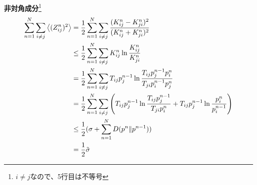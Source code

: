\documentclass[a4paper,11pt]{jsarticle}
\numberwithin{equation}{section}
\begin{document}
\textbf{非対角成分}\footnote{$i \neq j$なので、5行目は不等号}
\begin{align}
    \sum_{n=1}^{N} \sum_{i\neq j} \ev{(Z_{ij}^n)^2} &= \frac{1}{2}\sum_{n=1}^{N} \sum_{i\neq j} \frac{(K_{ij}^n - K_{ji}^n)^2}{(K_{ij}^n + K_{ji}^n)^2} \\
    &\leq \frac{1}{2}\sum_{n=1}^{N} \sum_{i\neq j} K_{ij}^n \ln \frac{K_{ij}^n}{K_{ji}^n}\\
    &= \frac{1}{2}\sum_{n=1}^{N} \sum_{i\neq j} T_{ij} p_j^{n-1} \ln \frac{T_{ij} p_j^{n-1} p_i^{n}}{T_{ji} p_i^{n-1} p_j^{n}}\\
    &= \frac{1}{2}\sum_{n=1}^{N} \sum_{i\neq j} \qty(T_{ij} p_j^{n-1} \ln \frac{T_{ij} p_j^{n-1}}{T_{ji} p_i^{n}} + T_{ij} p_j^{n-1} \ln \frac{p_i^{n}}{p_i^{n-1}})\\
    &\leq \frac{1}{2}(\sigma + \sum_{n=1}^{N} D(p^n \| p^{n-1}))\\
    &= \frac{1}{2}\tilde{\sigma}
\end{align}
\end{document}
